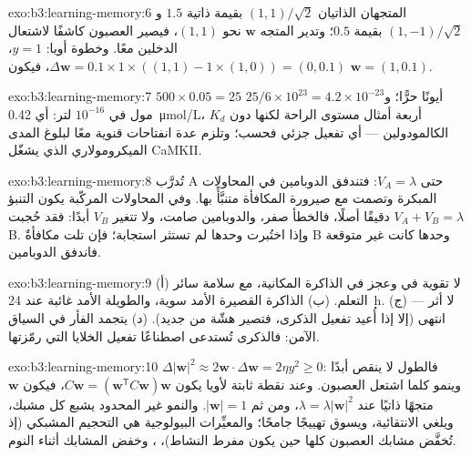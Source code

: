 \begin{solution}{exo:b3:learning-memory:6}
المتجهان الذاتيان $(1,1)/\sqrt{2}$ بقيمة ذاتية $1.5$
و$(1,-1)/\sqrt{2}$ بقيمة $0.5$؛ وتدير  المتجه
$\mathbf{w}$ نحو $(1,1)$، فيصير العصبون كاشفًا لاشتعال
الدخلين معًا. وخطوة أويا: $y = 1$،
$\Delta\mathbf{w} = 0.1\times 1\times((1,1) - 1\times(1,0)) = (0,0.1)$،
فيكون $\mathbf{w} = (1, 0.1)$.
\end{solution}

\begin{solution}{exo:b3:learning-memory:7}
$500\times 0.05 = 25$ أيونًا حرًّا؛ و$25/6\times 10^{23} = 4.2\times 10^{-23}$
مول في $10^{-16}$ لتر: أي \qty{0.42}{\micro mol/L}، أربعة أمثال
مستوى الراحة لكنها دون $K_{d}$ الكالمودولين --- أي تفعيل
جزئي فحسب؛ وتلزم عدة انفتاحات قنوية معًا لبلوغ المدى
الميكرومولاري الذي يشغّل CaMKII.
\end{solution}

\begin{solution}{exo:b3:learning-memory:8}
تُدرَّب A حتى $V_{A} = \lambda$: فتندفق الدوبامين في
المحاولات المبكرة وتصمت مع صيرورة المكافأة متنبَّأً بها.
وفي المحاولات المركّبة يكون التنبؤ $V_{A} + V_{B} = \lambda$
دقيقًا أصلًا، فالخطأ صفر، والدوبامين صامت، ولا تتغير $V_{B}$
أبدًا: فقد حُجبت B. وإذا اختُبرت وحدها لم تستثر استجابة؛
فإن تلت مكافأةٌ B وحدها كانت غير متوقعة فاندفق الدوبامين.
\end{solution}

\begin{solution}{exo:b3:learning-memory:9}
(أ) لا تقوية في  وعجز في الذاكرة المكانية، مع سلامة سائر
التعلم. (ب) الذاكرة القصيرة الأمد سوية، والطويلة الأمد
غائبة عند \qty{24}{h}. (ج) لا أثر ---  انتهى (إلا إذا
أُعيد تفعيل الذكرى، فتصير هشّة من جديد). (د) يتجمد الفأر في
السياق الآمن: فالذكرى تُستدعى اصطناعًا  تفعيل الخلايا
التي رمّزتها.
\end{solution}

\begin{solution}{exo:b3:learning-memory:10}
$\Delta|\mathbf{w}|^{2} \approx 2\mathbf{w}\cdot\Delta\mathbf{w} = 2\eta
y^{2} \ge 0$: فالطول لا ينقص أبدًا وينمو كلما اشتعل العصبون.
وعند نقطة ثابتة لأويا يكون $C\mathbf{w} = (\mathbf{w}^{\mathsf{T}}C
\mathbf{w})\mathbf{w}$، فيكون $\mathbf{w}$ متجهًا ذاتيًا عند $\lambda =
\lambda|\mathbf{w}|^{2}$، ومن ثم $|\mathbf{w}| = 1$. والنمو غير
المحدود يشبع كل مشبك، ويلغي الانتقائية، ويسوق تهييجًا
جامحًا؛ والمعيِّرات البيولوجية هي التحجيم المشبكي (إذ تُخفَّض
مشابك العصبون كلها حين يكون مفرط النشاط)، ، وخفض المشابك أثناء النوم.
\end{solution}

